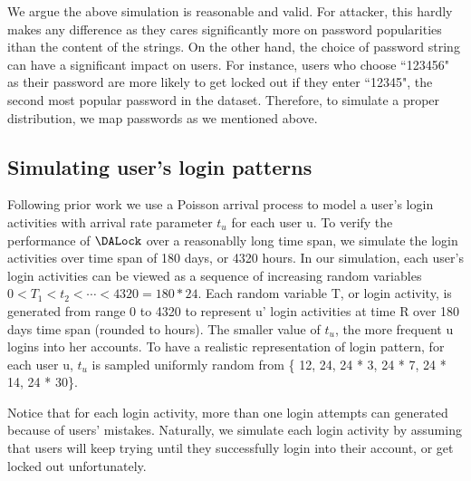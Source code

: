 We argue the above simulation is reasonable and valid. For attacker, this hardly makes any difference as they cares significantly more on password popularities ithan the content of the strings. On the other hand, the choice of password string can have a significant impact on users. For instance, users who choose ``123456" as their password are more likely to get locked out if they enter ``12345", the second most popular password in the dataset. Therefore, to simulate a proper distribution, we map passwords as we mentioned above.



\subsection{Simulating user's login patterns}Following prior work we use a Poisson arrival process to model a user's login activities\cite{AC:BloBluDat13}\cite{CCS:KogManBon17} with arrival rate parameter $t_u$ for each user u. To verify the performance of $\DALock$ over a reasonablly long time span, we simulate the login activities over time span of 180 days, or 4320 hours. In our simulation, each user's login activities can be viewed as a sequence of increasing random variables $0 < T_1 < t_2 < \cdots <  4320 = 180*24$. Each random variable T, or login activity, is generated from range 0 to 4320 to represent u' login activities at time R over 180 days time span (rounded to hours). The smaller value of $t_u$, the more frequent u logins into her accounts. To have a realistic representation of login pattern, for each user u, $t_u$ is sampled uniformly random from \{ 12, 24, 24 * 3, 24 * 7, 24 * 14, 24 * 30\}.

Notice that for each login activity, more than one login attempts can generated because of users' mistakes. Naturally, we simulate each login activity by assuming that users will keep trying until they successfully login into their account, or get locked out unfortunately.



